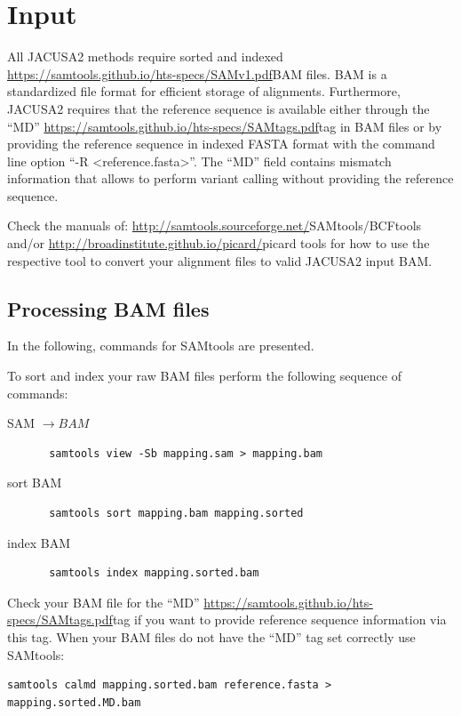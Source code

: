 \documentclass[10pt,a4paper]{article}
\begin{document}
\section{Input}
All JACUSA2 methods require sorted and indexed \url{https://samtools.github.io/hts-specs/SAMv1.pdf}{BAM} files.
BAM is a standardized file format for efficient storage of alignments.
Furthermore, JACUSA2 requires that the reference sequence is available either through the ``MD'' 
\url{https://samtools.github.io/hts-specs/SAMtags.pdf}{tag} in BAM files or by providing the reference 
sequence in indexed FASTA format with the command line option ``-R <reference.fasta>''.
The ``MD'' field contains mismatch information that allows to perform variant calling without providing 
the reference sequence.

Check the manuals of: \url{http://samtools.sourceforge.net/}{SAMtools/BCFtools} and/or
\url{http://broadinstitute.github.io/picard/}{picard tools} for how to use the
respective tool to convert your alignment files to valid JACUSA2 input BAM.
\subsection{Processing BAM files}
In the following, commands for SAMtools are presented.

To sort and index your raw BAM files perform the following sequence of commands:
\begin{description}
\item[SAM $\rightarrow BAM$] \begin{verbatim} samtools view -Sb mapping.sam > mapping.bam \end{verbatim}
\item[sort BAM] \begin{verbatim} samtools sort mapping.bam mapping.sorted \end{verbatim} 
\item[index BAM] \begin{verbatim} samtools index mapping.sorted.bam \end{verbatim}
\end{description}

Check your BAM file for the ``MD'' \url{https://samtools.github.io/hts-specs/SAMtags.pdf}{tag} 
if you want to provide reference sequence information via this tag. 
When your BAM files do not have the ``MD'' tag set correctly use SAMtools:
\begin{verbatim}
samtools calmd mapping.sorted.bam reference.fasta > mapping.sorted.MD.bam
\end{verbatim}
\end{document}

